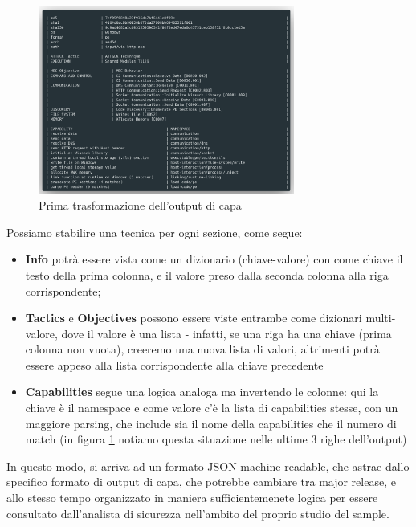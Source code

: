 \begin{figure}[htbp]
    \centering
    \includegraphics[width=0.75\textwidth]{assets/capa_out_first_parse.png}
    \caption{Prima trasformazione dell'output di capa}
    \label{fig:capa_out_first_parse}
\end{figure}

Possiamo stabilire una tecnica per ogni sezione, come segue:
\begin{itemize}
    \item \textbf{Info} potrà essere vista come un dizionario (chiave-valore) con come chiave il testo della prima colonna, e il valore preso dalla seconda colonna alla riga corrispondente;
    \item \textbf{Tactics} e \textbf{Objectives} possono essere viste entrambe come dizionari multi-valore, dove il valore è una lista -
    infatti, se una riga ha una chiave (prima colonna non vuota), creeremo una nuova lista di valori, altrimenti potrà essere appeso alla lista corrispondente alla chiave precedente
    \item \textbf{Capabilities} segue una logica analoga ma invertendo le colonne: qui la chiave è il namespace e come valore c'è la lista di capabilities stesse, con un maggiore parsing, che include sia il nome della capabilities che il numero di match (in figura \ref{fig:capa_out_first_parse} notiamo questa situazione nelle ultime 3 righe dell'output) 
\end{itemize}

In questo modo, si arriva ad un formato JSON machine-readable, che astrae dallo specifico formato di output di capa, che potrebbe cambiare tra major release, e allo stesso tempo organizzato in maniera sufficientemenete logica per essere consultato dall'analista di sicurezza nell'ambito del proprio studio del sample.

